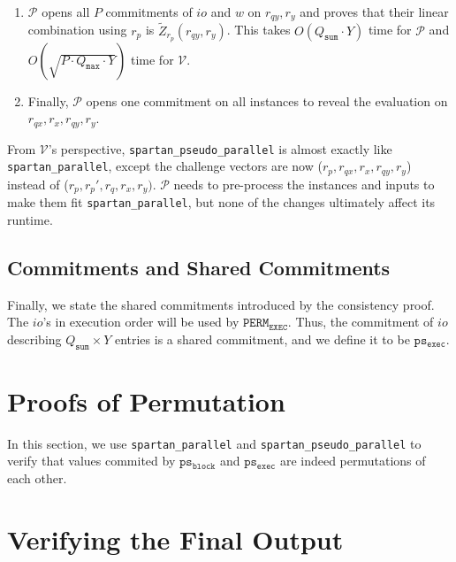 \documentclass{article}
\newcommand{\code}{\texttt}
\newcommand{\Qsum}{Q_{\mathtt{sum}}}
\newcommand{\Qmax}{Q_{\mathtt{max}}}
\renewcommand{\P}{\mathcal{P}}
\newcommand{\V}{\mathcal{V}}
\newcommand{\Z}{\widetilde{Z}}
\newcommand{\PERME}{\mathtt{PERM_{EXEC}}}
\newcommand{\psb}{\mathtt{ps_{block}}}
\newcommand{\pse}{\mathtt{ps_{exec}}}
\begin{document}
\begin{enumerate}
    \item $\P$ opens all $P$ commitments of $io$ and $w$ on $r_{qy}, r_y$ and proves that their linear combination using $r_p$ is $\Z_{r_p}(r_{qy}, r_y)$. This takes $O(\Qsum\cdot Y)$ time for $\P$ and $O(\sqrt{P\cdot \Qmax\cdot Y})$ time for $\V$.
    \item Finally, $\P$ opens one commitment on all instances to reveal the evaluation on $r_{qx}, r_x, r_{qy}, r_y$.
\end{enumerate}
From $\V$'s perspective, \code{spartan\_pseudo\_parallel} is almost exactly like \code{spartan\_parallel}, except the challenge vectors are now ($r_p, r_{qx}, r_x, r_{qy}, r_y$) instead of ($r_p, r_p', r_q, r_x, r_y)$. $\P$ needs to pre-process the instances and inputs to make them fit \code{spartan\_parallel}, but none of the changes ultimately affect its runtime.

\subsection{Commitments and Shared Commitments}

Finally, we state the shared commitments introduced by the consistency proof. The $io$'s in execution order will be used by $\PERME$. Thus, the commitment of $io$ describing $\Qsum \times Y$ entries is a shared commitment, and we define it to be $\pse$.


\section{Proofs of Permutation}\label{sec:permutation}

In this section, we use \code{spartan\_parallel} and \code{spartan\_pseudo\_parallel} to verify that values commited by $\psb$ and $\pse$ are indeed permutations of each other. 


\section{Verifying the Final Output}\label{sec:final_output}
\end{document}
